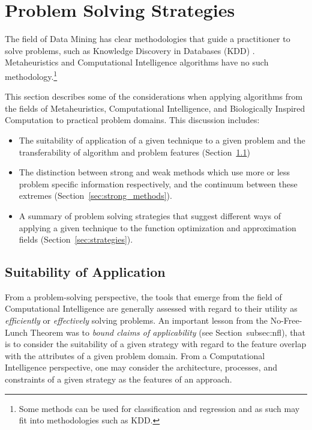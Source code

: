 
\section{Problem Solving Strategies} 
\label{advanced:sec:problem_solving}

The field of Data Mining has clear methodologies that guide a practitioner to solve problems, such as Knowledge Discovery in Databases (KDD) \cite{Fayyad1996}. Metaheuristics and Computational Intelligence algorithms have no such methodology.\footnote{Some methods can be used for classification and regression and as such may fit into methodologies such as KDD.}

This section describes some of the considerations when applying algorithms from the fields of Metaheuristics, Computational Intelligence, and Biologically Inspired Computation to practical problem domains. This discussion includes:

\begin{itemize} 
  \item The suitability of application of a given technique to a given problem and the transferability of algorithm and problem features (Section~\ref{sec:suitability})
  \item The distinction between strong and weak methods which use more or less problem specific information respectively, and the continuum between these extremes (Section~\ref{sec:strong_methods}).
	\item A summary of problem solving strategies that suggest different ways of applying a given technique to the function optimization and approximation fields (Section~\ref{sec:strategies}).
\end{itemize}

%
%
\subsection{Suitability of Application}
\label{sec:suitability}
From a problem-solving perspective, the tools that emerge from the field of Computational Intelligence are generally assessed with regard to their utility as \emph{efficiently} or \emph{effectively} solving problems.
An important lesson from the No-Free-Lunch Theorem was to \emph{bound claims of applicability} (see Section~{subsec:nfl}), that is to consider the suitability of a given strategy with regard to the feature overlap with the attributes of a given problem domain. From a Computational Intelligence perspective, one may consider the architecture, processes, and constraints of a given strategy as the features of an approach. 


